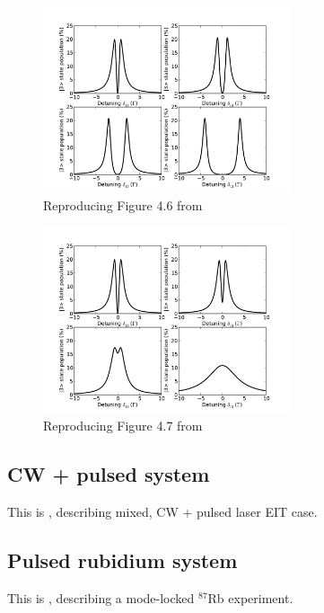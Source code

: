 \documentclass{article}
\begin{document}
\begin{spacing}{1.1}
\begin{figure}
\begin{center}
\includegraphics[width=0.65\textwidth]{figures/matt46.pdf}
\caption{Reproducing Figure 4.6 from \cite{McDonnell2003}}
\label{fig:matt46}
\end{center}
\end{figure}

\begin{figure}
\begin{center}
\includegraphics[width=0.65\textwidth]{figures/matt47.pdf}
\caption{Reproducing Figure 4.7 from \cite{McDonnell2003}}
\label{fig:matt47}
\end{center}
\end{figure}

\subsection{CW + pulsed system}
This is \cite{Soares2010}, describing mixed, CW + pulsed laser EIT case.

\subsection{Pulsed rubidium system}
This is \cite{Arissian2006}, describing a mode-locked $^{87}$Rb experiment.



\end{spacing}
\end{document}
